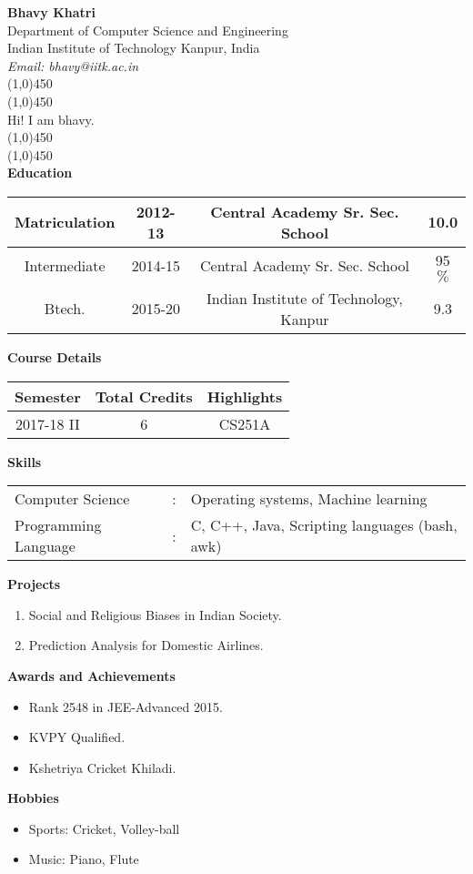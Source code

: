 \documentclass{article}
\begin{document}
\noindent
\textbf{Bhavy Khatri}\\
Department of Computer Science and Engineering\\
Indian Institute of Technology Kanpur, India\\
\textit{Email: bhavy@iitk.ac.in}\\
\line(1,0){450}\\
\line(1,0){450}\\
Hi! I am bhavy.\\
\line(1,0){450}\\
\line(1,0){450}\\
\noindent
\textbf{Education}
\begin{flushleft}
\begin{tabular}{ |c|c|c|c| } 
\hline
Matriculation & 2012-13 & Central Academy Sr. Sec. School & 10.0\\ 
\hline
Intermediate & 2014-15 & Central Academy Sr. Sec. School & 95 $ \%$ \\
\hline
Btech. & 2015-20 & Indian Institute of Technology, Kanpur & 9.3\\
\hline
\end{tabular}
\end{flushleft}
\noindent
\textbf{Course Details}
\begin{flushleft}
\begin{tabular}{ |c|c|c| } 
\hline
\textbf{Semester} & \textbf{Total Credits} & \textbf{Highlights}\\ 
\hline
2017-18 II & 6 & CS251A  \\
\hline
\end{tabular}
\end{flushleft}
\noindent
\textbf{Skills}
\begin{flushleft}
\begin{tabular}{ l l l} 
Computer Science & : & Operating systems, Machine learning\\ 
Programming Language& : & C, C++, Java, Scripting languages (bash, awk) \\
\end{tabular}
\end{flushleft}
\noindent
\textbf{Projects}
\begin{enumerate}
  \item Social and Religious Biases in Indian Society.
  \item Prediction Analysis for Domestic Airlines.
\end{enumerate}
\noindent
\textbf{Awards and Achievements}
\begin{itemize}
  \item[\textendash]  Rank 2548 in JEE-Advanced 2015.
  \item[\textendash]  KVPY Qualified.
  \item[\textendash]  Kshetriya Cricket Khiladi.
\end{itemize}
\noindent
\textbf{Hobbies}
\begin{itemize}
  \item[\textendash]  Sports: Cricket, Volley-ball
  \item[\textendash]  Music: Piano, Flute
\end{itemize}
\end{document}

